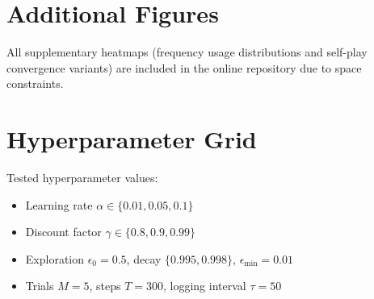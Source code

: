 \documentclass[conference]{IEEEtran}
\begin{document}
\section{Additional Figures}
All supplementary heatmaps (frequency usage distributions and self-play convergence variants) are included in the online repository due to space constraints.

\section{Hyperparameter Grid}
Tested hyperparameter values:
\begin{itemize}
  \item Learning rate $\alpha \in \{0.01,0.05,0.1\}$
  \item Discount factor $\gamma \in \{0.8,0.9,0.99\}$
  \item Exploration $\epsilon_{0}=0.5$, decay $\{0.995,0.998\}$, $\epsilon_{\min}=0.01$
  \item Trials $M=5$, steps $T=300$, logging interval $\tau=50$
\end{itemize}
\end{document}
